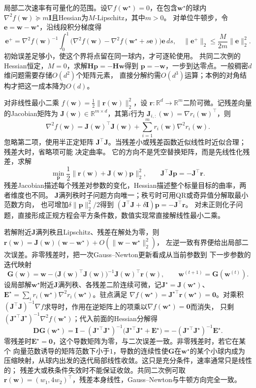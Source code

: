 局部二次速率有可量化的范围。设$\nabla f(\bm w^\star)=0$，在包含$\bm w^\star$的球内
$\nabla^2f(\bm w)\succeq m\bm I$且Hessian为$M$-Lipschitz，其中$m>0$。
对单位牛顿步，令$\bm e=\bm w-\bm w^\star$，沿线段积分梯度得
\[
 \bm e^+
 =\nabla^2f(\bm w)^{-1}\!
 \int_0^1\bigl(\nabla^2f(\bm w)-\nabla^2f(\bm w^\star+s\bm e)\bigr)\bm e\,ds,
 \quad
 \|\bm e^+\|_2\leq\frac{M}{2m}\|\bm e\|_2^2.
\]
初始误差足够小，使这个界将点留在同一球内，才可逐轮使用。
共同二次例的Hessian恒定，$M=0$，求解$\bm H\bm p=-\bm H\bm w$得到
$\bm p=-\bm w$，一步到达零点。一般稠密$d$维问题需要存储$O(d^2)$个矩阵元素，
直接分解约需$O(d^3)$运算；本例的对角结构才把这一成本降为$O(d)$。

对非线性最小二乘
$f(\bm{w})=\frac12\lVert\bm{r}(\bm{w})\rVert_2^2$，设
$\bm{r}:\mathbb{R}^d\to\mathbb{R}^m$二阶可微。记残差向量的Jacobian矩阵为
$\bm{J}(\bm{w})\in\mathbb{R}^{m\times d}$，其第$i$行为
$\bm{J}_{i,:}(\bm{w})=\nabla r_i(\bm{w})^{\top}$，则
\[
  \nabla^2f(\bm{w})
  =\bm{J}(\bm{w})^{\top}\bm{J}(\bm{w})
  +\sum_{i=1}^m r_i(\bm{w})\nabla^2r_i(\bm{w}).
\]
忽略第二项，使用半正定矩阵
$\bm{J}^{\top}\bm{J}$。当残差小或残差函数近似线性时近似合理；残差大时，省略项可能
决定曲率。
它的方向不是凭空替换矩阵，而是先线性化残差，求解
\[
 \min_{\bm p}\frac12\|\bm r(\bm w)+\bm J(\bm w)\bm p\|_2^2,
 \qquad
 \bm J^\top\bm J\bm p=-\bm J^\top\bm r.
\]
残差Jacobian描述每个残差对参数的变化，Hessian描述整个标量目标的曲率，两者维度也不同。
$\bm J$满列秩时子问题方向唯一；秩亏时可用QR或奇异值分解取最小范数方向，
也可增加$\delta\|\bm p\|_2^2/2$得到
$(\bm J^\top\bm J+\delta\bm I)\bm p=-\bm J^\top\bm r$。
对未正则化子问题，直接形成正规方程会平方条件数，数值实现常直接解线性最小二乘。

若解附近$\bm J$满列秩且Lipschitz、残差在解处为零，则
$\bm r(\bm w)=\bm J(\bm w)(\bm w-\bm w^\star)+O(\|\bm w-\bm w^\star\|_2^2)$，
左逆一致有界便给出局部二次误差。非零残差时，把一次Gauss--Newton更新看成从当前参数到
下一步参数的迭代映射
\[
 \bm G(\bm w)=\bm w-\bigl(\bm J(\bm w)^\top\bm J(\bm w)\bigr)^{-1}\bm J(\bm w)^\top\bm r(\bm w),
 \qquad \bm w^{(t+1)}=\bm G(\bm w^{(t)}).
\]
设局部解$\bm w^\star$附近$\bm J$满列秩、各残差二阶连续可微，记$\bm J^\star=\bm J(\bm w^\star)$、
$\bm E^\star=\sum_i r_i(\bm w^\star)\nabla^2r_i(\bm w^\star)$。驻点满足
$\nabla f(\bm w^\star)=\bm J^{\star\top}\bm r(\bm w^\star)=\bm 0$。对乘积
$(\bm J^\top\bm J)^{-1}\nabla f$求导时，作用在逆矩阵上的项乘以$\nabla f(\bm w^\star)=\bm0$而消失，
只剩$(\bm J^{\star\top}\bm J^\star)^{-1}\nabla^2f(\bm w^\star)$；代入前面的Hessian分解得
\[
 \bm D\bm G(\bm w^\star)
 =\bm I-(\bm J^{\star\top}\bm J^\star)^{-1}\bigl(\bm J^{\star\top}\bm J^\star+\bm E^\star\bigr)
 =-(\bm J^{\star\top}\bm J^\star)^{-1}\bm E^\star.
\]
零残差时$\bm E^\star=\bm 0$，这个导数矩阵为零，与二次误差一致。非零残差时，若它在某个
向量范数诱导的矩阵范数下小于$1$，导数的连续性使$\bm G$在$\bm w^\star$的某个小球内成为
压缩映射，从球内出发的迭代局部线性收敛。这只是充分条件，速率通常只是线性的；
残差大或秩条件失效时不能保证收敛。共同二次例可取
$\bm r(\bm w)=(w_1,4w_2)^\top$，残差本身线性，Gauss--Newton与牛顿方向完全一致。

